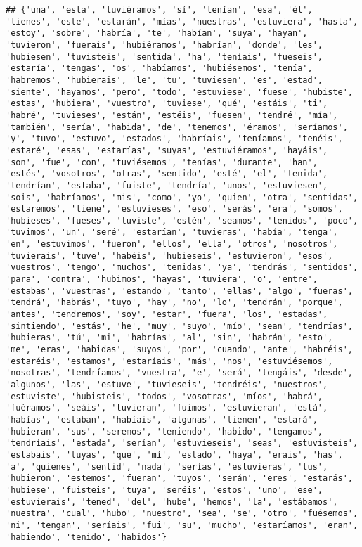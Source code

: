 \documentclass[
]{article}
\begin{document}
\begin{verbatim}
## {'una', 'esta', 'tuviéramos', 'sí', 'tenían', 'esa', 'él', 'tienes', 'este', 'estarán', 'mías', 'nuestras', 'estuviera', 'hasta', 'estoy', 'sobre', 'habría', 'te', 'habían', 'suya', 'hayan', 'tuvieron', 'fuerais', 'hubiéramos', 'habrían', 'donde', 'les', 'hubiesen', 'tuvisteis', 'sentida', 'ha', 'teníais', 'fueseis', 'estaría', 'tengas', 'os', 'habíamos', 'hubiésemos', 'tenía', 'habremos', 'hubierais', 'le', 'tu', 'tuviesen', 'es', 'estad', 'siente', 'hayamos', 'pero', 'todo', 'estuviese', 'fuese', 'hubiste', 'estas', 'hubiera', 'vuestro', 'tuviese', 'qué', 'estáis', 'ti', 'habré', 'tuvieses', 'están', 'estéis', 'fuesen', 'tendré', 'mía', 'también', 'sería', 'habida', 'de', 'tenemos', 'éramos', 'seríamos', 'y', 'tuvo', 'estuvo', 'estados', 'habríais', 'teníamos', 'tenéis', 'estaré', 'esas', 'estarías', 'suyas', 'estuviéramos', 'hayáis', 'son', 'fue', 'con', 'tuviésemos', 'tenías', 'durante', 'han', 'estés', 'vosotros', 'otras', 'sentido', 'esté', 'el', 'tenida', 'tendrían', 'estaba', 'fuiste', 'tendría', 'unos', 'estuviesen', 'sois', 'habríamos', 'mis', 'como', 'yo', 'quien', 'otra', 'sentidas', 'estaremos', 'tiene', 'estuvieses', 'eso', 'serás', 'era', 'somos', 'hubieses', 'fueses', 'tuviste', 'estén', 'seamos', 'tenidos', 'poco', 'tuvimos', 'un', 'seré', 'estarían', 'tuvieras', 'había', 'tenga', 'en', 'estuvimos', 'fueron', 'ellos', 'ella', 'otros', 'nosotros', 'tuvierais', 'tuve', 'habéis', 'hubieseis', 'estuvieron', 'esos', 'vuestros', 'tengo', 'muchos', 'tenidas', 'ya', 'tendrás', 'sentidos', 'para', 'contra', 'hubimos', 'hayas', 'tuviera', 'o', 'entre', 'estabas', 'vuestras', 'estando', 'tanto', 'ellas', 'algo', 'fueras', 'tendrá', 'habrás', 'tuyo', 'hay', 'no', 'lo', 'tendrán', 'porque', 'antes', 'tendremos', 'soy', 'estar', 'fuera', 'los', 'estadas', 'sintiendo', 'estás', 'he', 'muy', 'suyo', 'mío', 'sean', 'tendrías', 'hubieras', 'tú', 'mi', 'habrías', 'al', 'sin', 'habrán', 'esto', 'me', 'eras', 'habidas', 'suyos', 'por', 'cuando', 'ante', 'habréis', 'estaréis', 'estamos', 'estaríais', 'más', 'nos', 'estuviésemos', 'nosotras', 'tendríamos', 'vuestra', 'e', 'será', 'tengáis', 'desde', 'algunos', 'las', 'estuve', 'tuvieseis', 'tendréis', 'nuestros', 'estuviste', 'hubisteis', 'todos', 'vosotras', 'míos', 'habrá', 'fuéramos', 'seáis', 'tuvieran', 'fuimos', 'estuvieran', 'está', 'habías', 'estaban', 'habíais', 'algunas', 'tienen', 'estará', 'hubieran', 'sus', 'seremos', 'teniendo', 'habido', 'tengamos', 'tendríais', 'estada', 'serían', 'estuvieseis', 'seas', 'estuvisteis', 'estabais', 'tuyas', 'que', 'mí', 'estado', 'haya', 'erais', 'has', 'a', 'quienes', 'sentid', 'nada', 'serías', 'estuvieras', 'tus', 'hubieron', 'estemos', 'fueran', 'tuyos', 'serán', 'eres', 'estarás', 'hubiese', 'fuisteis', 'tuya', 'seréis', 'estos', 'uno', 'ese', 'estuvierais', 'tened', 'del', 'hube', 'hemos', 'la', 'estábamos', 'nuestra', 'cual', 'hubo', 'nuestro', 'sea', 'se', 'otro', 'fuésemos', 'ni', 'tengan', 'seríais', 'fui', 'su', 'mucho', 'estaríamos', 'eran', 'habiendo', 'tenido', 'habidos'}
\end{verbatim}
\end{document}
